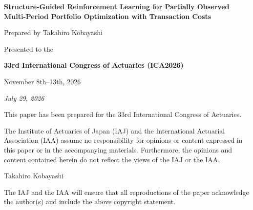 \documentclass[a4paper,10pt]{article}
\title{\ICAPaperTitle}
\author{\ICAAuthorName}
\date{}
\newcommand{\ICAPaperTitle}{Structure-Guided Reinforcement Learning for Partially Observed\\
Multi-Period Portfolio Optimization with Transaction Costs}
\newcommand{\ICAAuthorName}{Takahiro Kobayashi}
\newcommand{\ICASessionTitle}{\ICAPaperTitle}
\begin{document}
\hypersetup{pageanchor=false}
\begin{titlepage}
\thispagestyle{empty}
\centering
\vspace*{1.5cm}
{\Large\bfseries \ICASessionTitle\par}
\vspace{1.2cm}
{\large Prepared by \ICAAuthorName\par}
\vfill
{\large Presented to the\par}
\vspace{0.35cm}
{\Large\bfseries 33rd International Congress of Actuaries (ICA2026)\par}
\vspace{0.35cm}
{\large November 8th--13th, 2026\par}
\vspace{0.45cm}
{\small\itshape July 29, 2026\par}
\vfill
\begin{minipage}{0.88\textwidth}
\small
This paper has been prepared for the 33rd International Congress of Actuaries.

The Institute of Actuaries of Japan (IAJ) and the International Actuarial Association (IAA) assume no responsibility for opinions or content expressed in this paper or in the accompanying materials. Furthermore, the opinions and content contained herein do not reflect the views of the IAJ or the IAA.

\vspace{0.8em}
\ICAAuthorName

\vspace{0.8em}
The IAJ and the IAA will ensure that all reproductions of the paper acknowledge the author(s) and include the above copyright statement.
\end{minipage}
\vfill
\end{titlepage}

\hypersetup{pageanchor=true}
\maketitle
\end{document}
